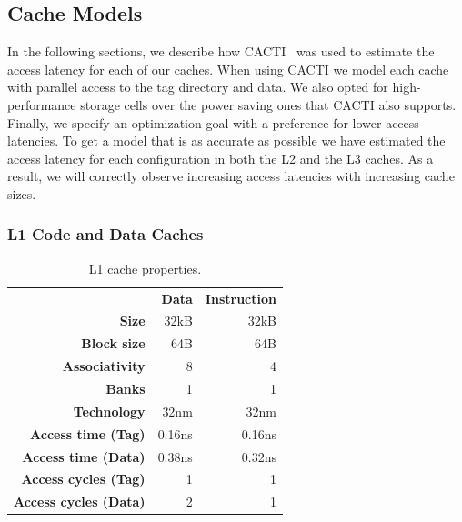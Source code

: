 \subsection{Cache Models}
In the following sections, we describe how CACTI~\cite{Shivakumar2001} was used to estimate the access latency for each of our caches. 
When using CACTI we model each cache with parallel access to the tag directory and data.
We also opted for high-performance storage cells over the power saving ones that CACTI also supports.
Finally, we specify an optimization goal with a preference for lower access latencies.
To get a model that is as accurate as possible we have estimated the access latency for each configuration in both the L2 and the L3 caches.
As a result, we will correctly observe increasing access latencies with increasing cache sizes.

\subsubsection{L1 Code and Data Caches}


\begin{table}[ht]
\centering
\begin{tabular}{rrr}
\toprule
                          & \bf{Data}     & \bf{Instruction} \\
\bf{Size}                 & 32kB          & 32kB      \\
\bf{Block size}           & 64B           & 64B       \\
\bf{Associativity}        & 8             & 4         \\
\bf{Banks}                & 1             & 1         \\
\bf{Technology}           & 32nm          & 32nm      \\
\bf{Access time (Tag)}    & 0.16ns        & 0.16ns    \\
\bf{Access time (Data)}   & 0.38ns        & 0.32ns    \\
\bf{Access cycles (Tag)}  & 1             & 1         \\
\bf{Access cycles (Data)} & 2             & 1         \\
\bottomrule
\end{tabular}
\caption{L1 cache properties.}
\label{tbl:processor_model:l1}
\end{table}

